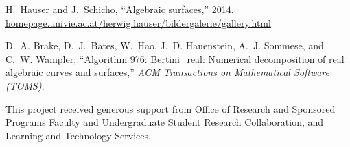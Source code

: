 \documentclass[paperwidth=46in, paperheight = 33.11in]{baposter}%
\begin{document}
\begin{poster}
{\begin{thebibliography}{1}
H.~Hauser and J.~Schicho, ``Algebraic surfaces,'' 2014.
  \url{homepage.univie.ac.at/herwig.hauser/bildergalerie/gallery.html}


D.~A. Brake, D.~J.~Bates, W.~Hao, J.~D. Hauenstein, A.~J. Sommese, and
  C.~W. Wampler, ``Algorithm 976: Bertini\_real: Numerical decomposition of
  real algebraic curves and surfaces,'' \emph{ACM Transactions on Mathematical
  Software (TOMS)}.

\vspace{6.3mm}	
This project received generous support from Office of Research and Sponsored Programs Faculty and Undergraduate Student Research Collaboration, and Learning and Technology Services. 
\end{thebibliography}


}




\end{poster}
\end{document}

